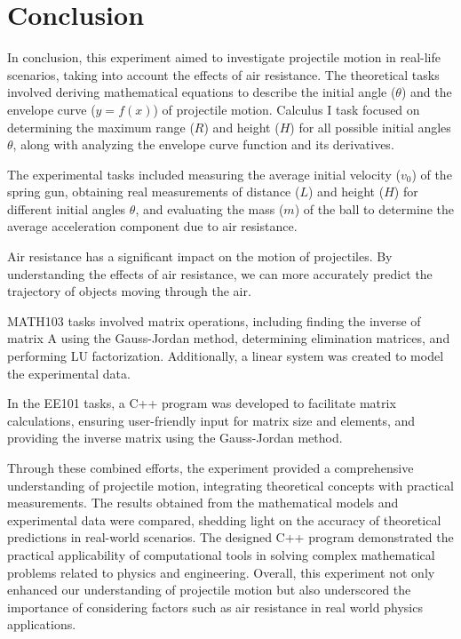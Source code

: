 \chapter{Conclusion}

In conclusion, this experiment aimed to investigate projectile motion in real-life 
scenarios, taking into account the effects of air resistance. The theoretical tasks 
involved deriving mathematical equations to describe the initial angle ($\theta$) and 
the envelope curve ($y = f(x)$) of projectile motion. Calculus I task focused on 
determining the maximum range ($R$) and height ($H$) for all possible initial angles 
$\theta$, along with analyzing the envelope curve function and its derivatives. 

The experimental tasks included measuring the average initial velocity ($v_0$) of 
the spring gun, obtaining real measurements of distance ($L$) and height ($H$) for 
different initial angles $\theta$, and evaluating the mass ($m$) of the ball to determine the 
average acceleration component due to air resistance. 

Air resistance has a significant impact on the motion of projectiles. By 
understanding the effects of air resistance, we can more accurately predict the 
trajectory of objects moving through the air. 

MATH103 tasks involved matrix operations, including finding the inverse of 
matrix A using the Gauss-Jordan method, determining elimination matrices, and 
performing LU factorization. Additionally, a linear system was created to model 
the experimental data. 

In the EE101 tasks, a C++ program was developed to facilitate matrix 
calculations, ensuring user-friendly input for matrix size and elements, and 
providing the inverse matrix using the Gauss-Jordan method. 

Through these combined efforts, the experiment provided a comprehensive 
understanding of projectile motion, integrating theoretical concepts with 
practical measurements. The results obtained from the mathematical models and 
experimental data were compared, shedding light on the accuracy of theoretical 
predictions in real-world scenarios. The designed C++ program demonstrated 
the practical applicability of computational tools in solving complex 
mathematical problems related to physics and engineering. Overall, this 
experiment not only enhanced our understanding of projectile motion but also 
underscored the importance of considering factors such as air resistance in real
world physics applications. 
